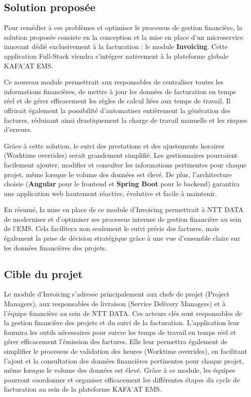 \documentclass[12pt, a4paper, openany]{report}
\begin{document}
\vspace{-0.4cm}

\subsection{Solution proposée}

\vspace{-0.4cm}
Pour remédier à ces problèmes et optimiser le processus de gestion financière, la solution proposée consiste en la conception et la mise en place d'un microservice innovant dédié exclusivement à la facturation : le module \textbf{Invoicing}. Cette application Full-Stack viendra s'intégrer nativement à la plateforme globale KAFA'AT EMS.

Ce nouveau module permettrait aux responsables de centraliser toutes les informations financières, de mettre à jour les données de facturation en temps réel et de gérer efficacement les règles de calcul liées aux temps de travail. Il offrirait également la possibilité d'automatiser entièrement la génération des factures, réduisant ainsi drastiquement la charge de travail manuelle et les risques d'erreurs.

Grâce à cette solution, le suivi des prestations et des ajustements horaires (Worktime overrides) serait grandement simplifié. Les gestionnaires pourraient facilement ajouter, modifier et consulter les informations pertinentes pour chaque projet, même lorsque le volume des données est élevé. De plus, l'architecture choisie (\textbf{Angular} pour le frontend et \textbf{Spring Boot} pour le backend) garantira une application web hautement réactive, évolutive et facile à maintenir.

En résumé, la mise en place de ce module d'Invoicing permettrait à NTT DATA de moderniser et d'optimiser ses processus internes de gestion financière au sein de l'EMS. Cela facilitera non seulement le suivi précis des factures, mais également la prise de décision stratégique grâce à une vue d'ensemble claire sur les données financières des projets.

\vspace{-0.4cm}
\subsection{Cible du projet}

\vspace{-0.4cm}
Le module d'Invoicing s'adresse principalement aux chefs de projet (Project Managers), aux responsables de livraison (Service Delivery Managers) et à l'équipe financière au sein de NTT DATA. Ces acteurs clés sont responsables de la gestion financière des projets et du suivi de la facturation. L'application leur fournira les outils nécessaires pour suivre les temps de travail en temps réel et gérer efficacement l'émission des factures. Elle leur permettra également de simplifier le processus de validation des heures (Worktime overrides), en facilitant l'ajout et la consultation des données financières pertinentes pour chaque projet, même lorsque le volume des données est élevé. Grâce à ce module, les équipes pourront coordonner et organiser efficacement les différentes étapes du cycle de facturation au sein de la plateforme KAFA'AT EMS.
\end{document}
